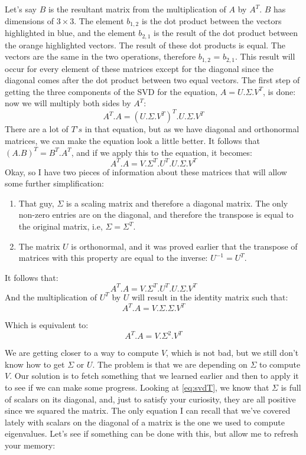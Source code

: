 \documentclass[a4,12pt,twosided,openany]{memoir}
\begin{document}
Let’s say $B$ is the resultant matrix from the multiplication of $A$ by $A^T$. $B$ has dimensions of $3 \times 3$. The element $b_{1,2}$ is the dot product between the vectors highlighted in blue, and the element $b_{2,1}$ is the result of the dot product between the orange highlighted vectors. The result of these dot products is equal. The vectors are the same in the two operations, therefore $b_{1,2}$ = $b_{2,1}$. This result will occur for every element of these matrices except for the diagonal since the diagonal comes after the dot product between two equal vectors. The first step of getting the three components of the SVD for the equation, $A = U.\Sigma.V^T$, is done: now we will multiply both sides by $A^T$:
\[A^T.A = (U.\Sigma.V^T)^T.U.\Sigma.V^T\]
There are a lot of $T’s$ in that equation, but as we have diagonal and orthonormal matrices, we can make the equation look a little better. It follows that $(A.B)^T = B^T.A^T$, and if we apply this to the equation, it becomes:
\[A^T.A = V.\Sigma^T.U^T.U.\Sigma.V^T\]
Okay, so I have two pieces of information about these matrices that will allow some further simplification:
\begin{tcolorbox}
\begin{enumerate}
\item That guy, $\Sigma$ is a scaling matrix and therefore a diagonal matrix. The only non-zero entries are on the diagonal, and therefore the transpose is equal to the original matrix, i.e, $\Sigma = \Sigma^T$.
\item The matrix $U$ is orthonormal, and it was proved earlier that the transpose of matrices with this property are equal to the inverse: $U^{-1} = U^T$.
\end{enumerate}
\end{tcolorbox}
\par 
\indent
It follows that:
\[A^T.A = V.\Sigma^T.U^T.U.\Sigma.V^T\]
And the multiplication of $U^T$ by $U$ will result in the identity matrix such that:
\[ A^T.A = V.\Sigma.\Sigma.V^T\]
\par 
\indent
Which is equivalent to:
\begin{equation}\label{eq:svdT}
A^T.A = V.\Sigma^2.V^T
\end{equation}
\par 
\indent
We are getting closer to a way to compute $V$, which is not bad, but we still don’t know how to get $\Sigma$ or $U$. The problem is that we are depending on $\Sigma$ to compute $V$. Our solution is to fetch something that we learned earlier and then to apply it to see if we can make some progress. Looking at \ref{eq:svdT}, we know that  $\Sigma$ is full of scalars on its diagonal, and, just to satisfy your curiosity, they are all positive since we squared the matrix. The only equation I can recall that we’ve covered lately with scalars on the diagonal of a matrix is the one we used to compute eigenvalues. Let’s see if something can be done with this, but allow me to refresh your memory:
\end{document}
